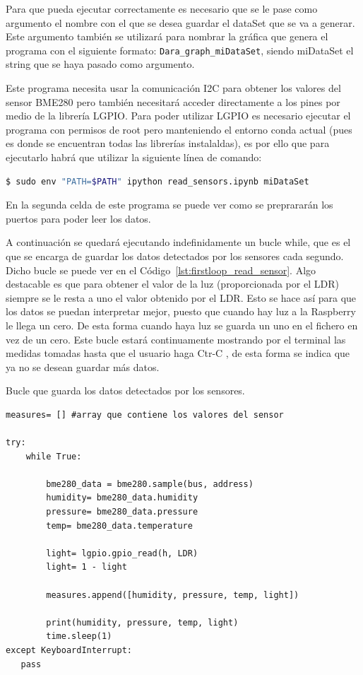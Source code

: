 \documentclass[a4paper, 12pt]{book}
\begin{document}
Para que pueda ejecutar correctamente es necesario que se le pase como argumento el nombre con el que se desea guardar el dataSet que se va a generar. Este argumento también se utilizará para nombrar la gráfica que genera el programa con el siguiente formato: \texttt{Dara\_graph\_miDataSet}, siendo miDataSet el string que se haya pasado como argumento.

Este programa necesita usar la comunicación I2C para obtener los valores del sensor BME280 pero también necesitará acceder directamente a los pines por medio de la librería LGPIO. Para poder utilizar LGPIO es necesario ejecutar el programa con permisos de root pero manteniendo el entorno conda actual (pues es donde se encuentran todas las librerías instalaldas), es por ello que para ejecutarlo habrá que utilizar la siguiente línea de comando:  


\begin{lstlisting}[language=bash]
    $ sudo env "PATH=$PATH" ipython read_sensors.ipynb miDataSet
\end{lstlisting}

En la segunda celda de este programa se puede ver como se preprararán los puertos para poder leer los datos. 

A continuación se quedará ejecutando indefinidamente un bucle while, que es el que se encarga de guardar los datos detectados por los sensores cada segundo. Dicho bucle se puede ver en el Código~\ref{lst:firstloop_read_sensor}. Algo destacable es que para obtener el valor de la luz (proporcionada por el LDR) siempre se le resta a uno el valor obtenido por el LDR. Esto se hace así para que los datos se puedan interpretar mejor, puesto que cuando hay luz a la Raspberry le llega un cero. De esta forma cuando haya luz se guarda un uno en el fichero en vez de un cero. 
Este bucle estará continuamente mostrando por el terminal las medidas tomadas hasta que el usuario haga Ctr-C , de esta forma se indica que ya no se desean guardar más datos.

\begin{listing}[]
    \caption{Bucle que guarda los datos detectados por los sensores.}{}
    \label{lst:firstloop_read_sensor}
    \begin{verbatim}
measures= [] #array que contiene los valores del sensor

try:
    while True:

        bme280_data = bme280.sample(bus, address)
        humidity= bme280_data.humidity
        pressure= bme280_data.pressure
        temp= bme280_data.temperature
        
        light= lgpio.gpio_read(h, LDR)
        light= 1 - light
        
        measures.append([humidity, pressure, temp, light])
        
        print(humidity, pressure, temp, light)
        time.sleep(1)
except KeyboardInterrupt:
   pass  
    \end{verbatim}
\end{listing}
\end{document}

